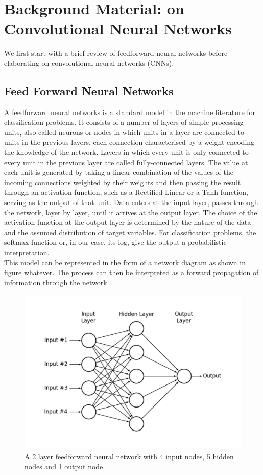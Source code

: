 \chapter{Background Material: on Convolutional Neural Networks}

\noindent We first start with a brief review of feedforward neural networks before elaborating on convolutional neural networks (CNNs). 

\section{Feed Forward Neural Networks}

A feedforward neural networks is a standard model in the machine literature for classification problems. It consists of a number of layers of simple processing units, also called neurons or nodes in which units in a layer are connected to units in the previous layers, each connection characterised by a weight encoding the knowledge of the network. Layers in which every unit is only connected to every unit in the previous layer are called fully-connected layers. The value at each unit is generated by taking a linear combination of the values of the incoming connections weighted by their weights and then passing the result through an activation function, such as a Rectified Linear or a Tanh function, serving as the output of that unit. Data enters at the input layer, passes through the network, layer by layer, until it arrives at the output layer. The choice of the activation function at the output layer is determined by the nature of the data and the assumed distribution of target variables. For classification problems, the softmax function or, in our case, its log, give the output a probabilistic interpretation.\\

\noindent This model can be represented in the form of a network diagram as shown in figure whatever. The process can then be interpreted as a forward propagation of information through the network.\\

\begin{figure}
\centering
\includegraphics[trim=2cm 2cm 2cm 2cm, clip=true, height=80mm]{Chapter2/FF_Neural_Network.pdf}
\caption{A 2 layer feedforward neural network with 4 input nodes, 5 hidden nodes and 1 output node.}
\end{figure}


